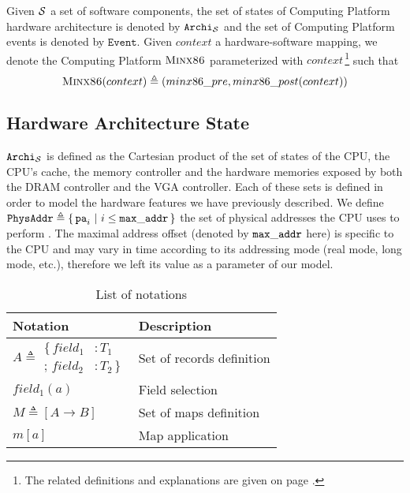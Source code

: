Given $\mathcal{S}$ a set of software components, the set of states of
 Computing Platform hardware architecture is denoted by
$\texttt{Archi}_{\mathcal{S}}$ and the set of  Computing Platform
events is denoted by $\texttt{Event}$. Given $context$ a hardware-software
mapping, we denote the Computing Platform $\textsc{Minx86}$ parameterized
with $context$\,\footnote{The related definitions and explanations are given on
  page \pageref{page:minx86def}.} such that
\[ \textsc{Minx86}(context) \triangleq (minx86\_pre,
  minx86\_post(context)) \]

\subsection{Hardware Architecture State}

$\texttt{Archi}_{\mathcal{S}}$ is defined as the Cartesian product of the set of
states of the CPU, the CPU's cache, the memory controller and the hardware
memories exposed by both the DRAM controller and the VGA controller. Each of
these sets is defined in order to model the hardware features we have previously
described. We define
$\texttt{PhysAddr} \triangleq \{\,\mathtt{pa}_i\ |\ i \leq \mathtt{max\_addr}\,\}$ the
set of physical addresses the CPU uses to perform \IO. The maximal address
offset (denoted by $\mathtt{max\_addr}$ here) is specific to the CPU and may vary
in time according to its addressing mode (real mode, long mode, etc.), therefore
we left its value as a parameter of our model.

\begin{table}
\begin{center}
  \begin{tabular}{ll}
    \hline
    \bf{Notation} & \bf{Description} \\
    \hline
    $ A \triangleq \begin{array}{ll}
                      \{\,field_1 &: T_1 \\
                      ;\,field_2 &: T_2\,\}
                    \end{array} $ & Set of records definition \\
    \hline
    $field_1(a)$ & Field selection \\
    \hline
    $M \triangleq [A \rightarrow B]$ & Set of maps definition \\
    \hline
    $m[a]$ & Map application \\
    \hline
  \end{tabular}
  \caption{List of notations}
  \label{tab:notation}
\end{center}
\end{table}

